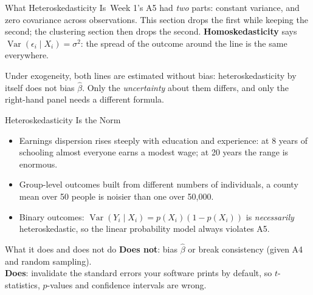 \documentclass[aspectratio=169,11pt,xcolor=dvipsnames]{beamer}
\DeclareMathOperator{\Var}{Var}
\newcommand{\core}{\,\raisebox{0.6pt}{\textcolor{corestar}{$\bigstar$}}}
\begin{document}
\begin{frame}{What Heteroskedasticity Is\core}
Week 1's A5 had \emph{two} parts: constant variance, and zero covariance
across observations. This section drops the first while keeping the second;
the clustering section then drops the second.
\textbf{Homoskedasticity} says $\Var(\epsilon_i\mid X_i) = \sigma^2$: the
spread of the outcome around the line is the same everywhere.
\vskip2pt
\begin{center}
\end{center}
\vskip2pt
Under exogeneity, both lines are estimated without bias: heteroskedasticity by
itself does not bias $\hat\beta$. Only the \emph{uncertainty} about them differs,
and only the right-hand panel needs a different formula.
\end{frame}

\begin{frame}{Heteroskedasticity Is the Norm}
\begin{itemize}\itemsep4pt
  \item Earnings dispersion rises steeply with education and experience: at 8
        years of schooling almost everyone earns a modest wage; at 20 years the
        range is enormous.
  \item Group-level outcomes built from different numbers of individuals, a
        county mean over 50 people is noisier than one over 50{,}000.
  \item Binary outcomes: $\Var(Y_i\mid X_i) = p(X_i)(1-p(X_i))$ is
        \emph{necessarily} heteroskedastic, so the linear probability model always
        violates A5.
\end{itemize}
\vskip3pt
\begin{block}{What it does and does not do}
\textbf{Does not}: bias $\hat\beta$ or break consistency (given A4 and
random sampling). \\
\textbf{Does}: invalidate the standard errors your software prints by default, so
$t$-statistics, $p$-values and confidence intervals are wrong.
\end{block}
\end{frame}
\end{document}
